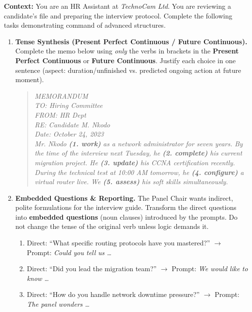 \documentclass[11pt]{article}
\begin{document}
\begin{exercice}
\textbf{Context:} You are an HR Assistant at \textit{TechnoCam Ltd}. You are reviewing a candidate's file and preparing the interview protocol. Complete the following tasks demonstrating command of advanced structures.

\begin{enumerate}
    \item \textbf{Tense Synthesis (Present Perfect Continuous / Future Continuous).} 
    Complete the memo below using \textit{only} the verbs in brackets in the \textbf{Present Perfect Continuous} or \textbf{Future Continuous}. Justify each choice in one sentence (aspect: duration/unfinished vs. predicted ongoing action at future moment).
    \begin{quote}
    \textit{MEMORANDUM \\
    TO: Hiring Committee \\
    FROM: HR Dept \\
    RE: Candidate M. Nkodo \\
    Date: October 24, 2023 \\
    Mr. Nkodo \textbf{(1. work)} as a network administrator for seven years. By the time of the interview next Tuesday, he \textbf{(2. complete)} his current migration project. He \textbf{(3. update)} his CCNA certification recently. During the technical test at 10:00 AM tomorrow, he \textbf{(4. configure)} a virtual router live. We \textbf{(5. assess)} his soft skills simultaneously.}
    \end{quote}
    \item \textbf{Embedded Questions \& Reporting.} 
    The Panel Chair wants indirect, polite formulations for the interview guide. Transform the direct questions into \textbf{embedded questions} (noun clauses) introduced by the prompts. Do not change the tense of the original verb unless logic demands it.
    \begin{enumerate}
        \item Direct: ``What specific routing protocols have you mastered?'' $\rightarrow$ Prompt: \textit{Could you tell us \dots}
        \item Direct: ``Did you lead the migration team?'' $\rightarrow$ Prompt: \textit{We would like to know \dots}
        \item Direct: ``How do you handle network downtime pressure?'' $\rightarrow$ Prompt: \textit{The panel wonders \dots}
    \end{enumerate}

\end{enumerate}
\end{exercice}
\end{document}
